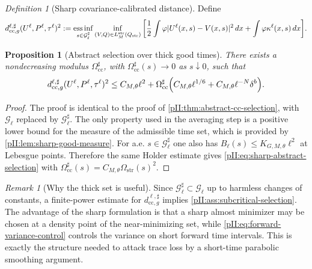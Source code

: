 \documentclass[11pt]{article}
\numberwithin{equation}{section}
\theoremstyle{plain}
\newtheorem{proposition}{Proposition}[section]
\theoremstyle{definition}
\theoremstyle{remark}
\newtheorem{definition}{Definition}[section]
\newtheorem{remark}{Remark}[section]
\DeclareMathOperator*{\essinf}{ess\,inf}
\newcommand{\str}{\mathrm{str}}
\newcommand{\cc}{\mathrm{cc}}
\newcommand{\dx}{\,dx}
\begin{document}
\begin{definition}[Sharp covariance-calibrated distance]\label{pII:def:sharp-cc-distance}
Define
\begin{equation}\label{pII:eq:sharp-cc-distance}
\begin{aligned}
        d^{\ell,\sharp}_{\cc,g}(U^\ell,P^\ell,\tau^\ell)^2
        :=\essinf_{s\in\mathcal G_\ell^\sharp}
        \inf_{(V,Q)\in L_M^{\str}(Q_{\rm str})}
        \bigg[
        \frac12\int\varphi|U^\ell(x,s)-V(x,s)|^2\dx
        +\int\varphi\kappa^\ell(x,s)\dx
        \bigg].
\end{aligned}
\end{equation}
\end{definition}

\begin{proposition}[Abstract selection over thick good times]\label{pII:prop:sharp-abstract-selection}
There exists a nondecreasing modulus $\Omega_{\cc}^\sharp$, with $\Omega_{\cc}^\sharp(s)\to0$ as $s\downarrow0$, such that
\begin{equation}\label{pII:eq:sharp-abstract-selection}
        d^{\ell,\sharp}_{\cc,g}(U^\ell,P^\ell,\tau^\ell)^2
        \le C_{M,\theta}\ell^2+
        \Omega_{\cc}^\sharp\Bigl(C_{M,\theta}\ell^{1/6}+C_{M,\theta}\ell^{-N}\delta^b\Bigr).
\end{equation}
\end{proposition}

\begin{proof}
The proof is identical to the proof of \cref{pII:thm:abstract-cc-selection}, with $\mathcal G_\ell$ replaced by $\mathcal G_\ell^\sharp$.  The only property used in the averaging step is a positive lower bound for the measure of the admissible time set, which is provided by \cref{pII:lem:sharp-good-measure}.  For a.e. $s\in\mathcal G_\ell^\sharp$ one also has $B_\ell(s)\le K_{G,M,\theta}\ell^2$ at Lebesgue points.  Therefore the same Holder estimate gives \eqref{pII:eq:sharp-abstract-selection} with $\Omega_{\cc}^\sharp(s)=C_{M,\theta}\Omega_{\str}(s)^2$.
\end{proof}

\begin{remark}[Why the thick set is useful]\label{pII:rem:why-thick-good-times}
Since $\mathcal G_\ell^\sharp\subset\mathcal G_\ell$ up to harmless changes of constants, a finite-power estimate for $d^{\ell,\sharp}_{\cc,g}$ implies \cref{pII:ass:subcritical-selection}.  The advantage of the sharp formulation is that a sharp almost minimizer may be chosen at a density point of the near-minimizing set, while \eqref{pII:eq:forward-variance-control} controls the variance on short forward time intervals.  This is exactly the structure needed to attack trace loss by a short-time parabolic smoothing argument.
\end{remark}
\end{document}
